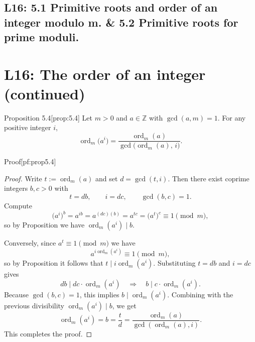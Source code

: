 \documentclass[10pt]{article}
\theoremstyle{definition}
\theoremstyle{plain}
\numberwithin{equation}{section}
\begin{document}
\subsection{L16:  5.1 Primitive roots and order of an integer modulo m. \& 5.2 Primitive roots for prime moduli.}

\section*{L16: The order of an integer (continued)}

\begin{define}{Proposition 5.4}[prop:5.4]
Let $m>0$ and $a\in\mathbb{Z}$ with $\gcd(a,m)=1$. For any positive integer $i$,
\[
\operatorname{ord}_m\!\bigl(a^i\bigr)=\frac{\operatorname{ord}_m(a)}{\gcd\bigl(\operatorname{ord}_m(a),\,i\bigr)}.
\]
\end{define}

\begin{define}{Proof}[pf:prop5.4]
\begin{proof}
Write $t:=\operatorname{ord}_m(a)$ and set $d=\gcd(t,i)$. Then there exist coprime integers $b,c>0$ with
\[
t=db,\qquad i=dc,\qquad \gcd(b,c)=1.
\]
Compute
\[
\bigl(a^i\bigr)^b = a^{i b} = a^{(dc)(b)} = a^{t c} = \bigl(a^t\bigr)^c \equiv 1 \pmod m,
\]
so by Proposition  we have $\operatorname{ord}_m(a^i)\mid b$.

Conversely, since $a^{t}\equiv 1\pmod m$ we have
\[
a^{i\operatorname{ord}_m(a^i)} \equiv 1\pmod m,
\]
so by Proposition  it follows that $t\mid i\operatorname{ord}_m(a^i)$. Substituting $t=db$ and $i=dc$ gives
\[
db \mid dc\cdot \operatorname{ord}_m(a^i) \quad\Longrightarrow\quad b \mid c\cdot\operatorname{ord}_m(a^i).
\]
Because $\gcd(b,c)=1$, this implies $b\mid \operatorname{ord}_m(a^i)$. Combining with the previous divisibility $\operatorname{ord}_m(a^i)\mid b$, we get
\[
\operatorname{ord}_m(a^i)=b=\frac{t}{d}=\frac{\operatorname{ord}_m(a)}{\gcd(\operatorname{ord}_m(a),i)}.
\]
This completes the proof.
\end{proof}
\end{define}
\end{document}
